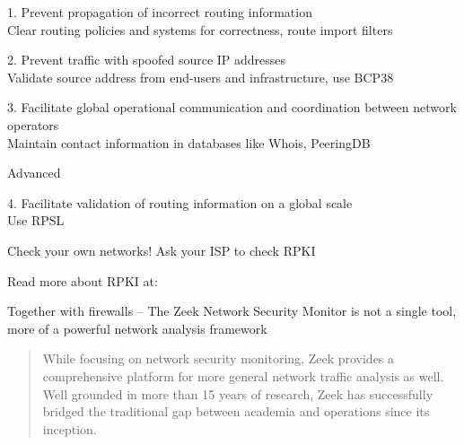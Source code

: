 \documentclass[Screen16to9,17pt]{foils}
\begin{document}
\begin{list1}
\item 1. Prevent propagation of incorrect routing information\\
Clear routing policies and systems for correctness, route import filters
\item 2. Prevent traffic with spoofed source IP addresses\\
Validate source address from end-users and infrastructure, use BCP38
\item 3. Facilitate global operational communication and coordination between network operators\\
Maintain contact information in databases like Whois, PeeringDB
{\small{}}

\item Advanced
\item 4. Facilitate validation of routing information on a global scale\\
Use RPSL {\small{}}
\end{list1}




\begin{list2}
\item Check your own networks! Ask your ISP to check RPKI\\
\item Read more about RPKI at:\\
\end{list2}



Together with firewalls -- The Zeek Network Security Monitor is not a single tool, more of a powerful network analysis framework


\begin{quote}
While focusing on network security monitoring, Zeek provides a comprehensive platform for more general network traffic analysis as well. Well grounded in more than 15 years of research, Zeek has successfully bridged the traditional gap between academia and operations since its inception.
\end{quote}
\end{document}
